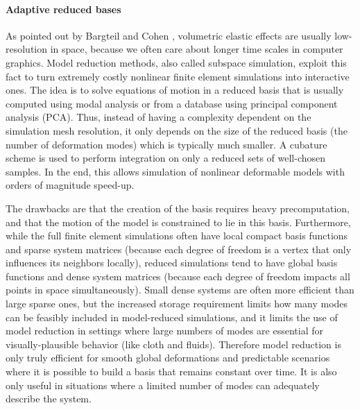 \paragraph*{Adaptive reduced bases}
As pointed out by Bargteil and Cohen \cite{bargteil2014animation}, volumetric elastic effects are usually low-resolution in space, because we often care about longer time scales in computer graphics.
Model reduction methods, also called subspace simulation, exploit this fact to turn extremely costly nonlinear finite element simulations into interactive ones.
The idea is to solve equations of motion in a reduced basis that is usually computed using modal analysis or from a database using principal component analysis (PCA).
Thus, instead of having a complexity dependent on the simulation mesh resolution, it only depends on the size of the reduced basis (the number of deformation modes) which is typically much smaller.
A cubature scheme is used to perform integration on only a reduced sets of well-chosen samples. In the end, this allows simulation of nonlinear deformable models with orders of magnitude speed-up.

The drawbacks are that the creation of the basis requires heavy precomputation, and that the motion of the model is constrained to lie in this basis. Furthermore, while the full finite element simulations often have local compact basis functions and sparse system matrices (because each degree of freedom is a vertex that only influences its neighbors locally), reduced simulations tend to have global basis functions and dense system matrices (because each degree of freedom impacts all points in space simultaneously). Small dense systems are often more efficient than large sparse ones, but the increased storage requirement limits how many modes can be feasibly included in model-reduced simulations, and it limits the use of model reduction in settings where large numbers of modes are essential for visually-plausible behavior (like cloth and fluids).
Therefore model reduction is only truly efficient for smooth global deformations and predictable scenarios where it is possible to build a basis that remains constant over time. It is also only useful in situations where a limited number of modes can adequately describe the system.

